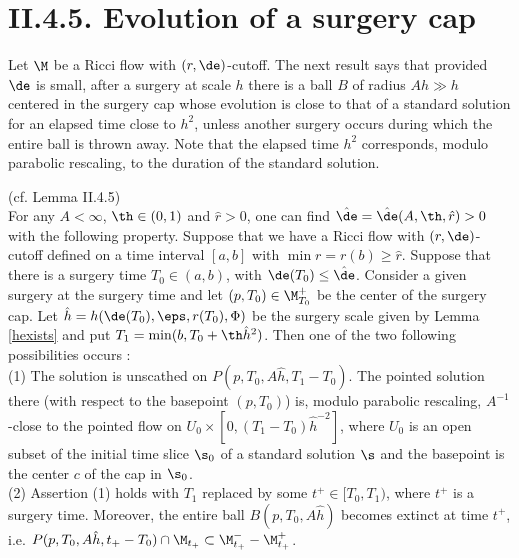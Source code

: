 \section{II.4.5. Evolution of a surgery cap}
\label{secII.4.5}

Let $\M$ be a Ricci flow with $(r,\de)$-cutoff.
The next result says that provided $\de$ is small,
after a surgery at scale $h$
there is a ball $B$  of radius $Ah\gg h$ centered in the
surgery cap whose evolution is close to that
of a standard solution for an elapsed time close to $h^2$,
unless another surgery occurs  during which
the entire ball is thrown away.   Note that the elapsed time $h^2$
corresponds, modulo parabolic rescaling, to the duration
of the standard solution.

\begin{lemma}
  \label{lem:kl-evolution-surgery-cap-existence-standard-solutions}
(cf. Lemma II.4.5)
\label{II.4.5}\\
For any $A<\infty$, $\th\in (0,1)$ and $\hat r>0$,
one can find $\hat\de=\hat\de(A,\th,\hat r)>0$
with the following property.  Suppose that we
have a Ricci flow with $(r, \de)$-cutoff
defined on a time interval $[a,b]$ with  $\min r=r(b)\geq \hat r$.
Suppose that there is a surgery time
$T_0\in (a,b)$, with $\de(T_0)\leq \hat\de$. Consider a given
surgery at the surgery time and let
$(p,T_0)\in\M_{T_0}^+$
be the center of the surgery cap.
Let $\hat h= h(\de(T_0),\eps,r(T_0),\Phi)$ be the surgery
scale given by Lemma \ref{hexists} and put
$T_1=\min(b,T_0+\th \hat h^2)$.
Then one of the two following possibilities occurs : \\
(1) The solution is unscathed on $P(p,T_0,A\hat h,T_1-T_0)$.
The pointed solution there (with respect to the basepoint
$(p, T_0)$) is, modulo parabolic
rescaling, $A^{-1}$-close to the pointed flow on
$U_0\times [0,(T_1-T_0)\hat h^{-2}]$, where
$U_0$ is an open subset of the initial time slice $\s_0$
of a standard solution
$\s$ and the basepoint is
the center $c$ of the cap in $\s_0$. \\
(2) Assertion (1) holds with $T_1$ replaced by some
$t^+ \in [T_0, T_1)$, where $t^+$ is a surgery time. Moreover,
the entire
ball $B(p,T_0,A\hat h)$ becomes extinct at time $t^+$,
i.e.
$P(p,T_0,A\hat h,t_+-T_0)\cap \M_{t_+}\subset \M_{t_+}^- - \M_{t_+}^+$.
\end{lemma}

